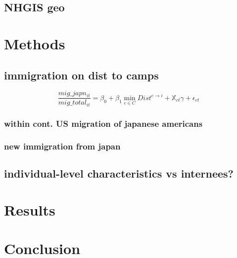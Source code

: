 \documentclass[12pt]{article}
\begin{document}
\subsection{NHGIS geo}\label{nhgis-geo}

\section{Methods}\label{methods}

\subsection{immigration on dist to
camps}\label{immigration-on-dist-to-camps}

\begin{equation}
    \frac{mig\_japn_{it}}{mig\_total_{it}} = \beta_0 + \beta_1 \min_{c\in C} Dist^{c\rightarrow i} 
+ \mathbb{X}_{ct} \gamma +  \epsilon_{ct}
\end{equation}

\subsubsection{within cont. US migration of japanese
americans}\label{within-cont.-us-migration-of-japanese-americans}

\subsubsection{new immigration from
japan}\label{new-immigration-from-japan}

\subsection{individual-level characteristics vs
internees?}\label{individual-level-characteristics-vs-internees}

\section{Results}\label{results}





\section{Conclusion}\label{conclusion}



\end{document}
